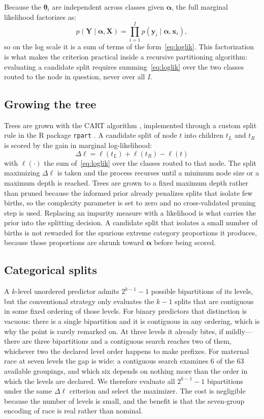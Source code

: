 \documentclass[AMA]{USG}
\begin{document}
Because the \(\boldsymbol{\theta}_i\) are independent across classes given \(\boldsymbol{\alpha}\), the full marginal likelihood factorizes as:
\[
  p(\mathbf{Y}\mid\boldsymbol{\alpha},\mathbf{X})
    = \prod_{i=1}^{I}p(\mathbf{y}_i\mid\boldsymbol{\alpha},\mathbf{x}_i),
\]
so on the log scale it is a sum of terms of the form~\eqref{eq:loglik}. This factorization is what makes the criterion practical inside a recursive partitioning algorithm: evaluating a candidate split requires summing~\eqref{eq:loglik} over the two classes routed to the node in question, never over all \(I\).



\subsection{Growing the tree}
Trees are grown with the CART algorithm \cite{breiman1984}, implemented through a custom split rule in the R package \texttt{rpart} \cite{rpart_docs}. A candidate split of node \(t\) into children \(t_L\) and \(t_R\) is scored by the gain in marginal log-likelihood:
\[\Delta\ell = \ell(t_L) + \ell(t_R) - \ell(t)\]
with \(\ell(\cdot)\) the sum of~\eqref{eq:loglik} over the classes routed to that node. The split maximizing \(\Delta\ell\) is taken and the process recurses until a minimum node size or a maximum depth is reached. Trees are grown to a fixed maximum depth rather than pruned because the informed prior already penalizes splits that isolate few births, so the complexity parameter is set to zero and no cross-validated pruning step is used. Replacing an impurity measure with a likelihood is what carries the prior into the splitting decision. A candidate split that isolates a small number of births is not rewarded for the spurious extreme category proportions it produces, because those proportions are shrunk toward \(\boldsymbol{\alpha}\) before being scored. 


\subsection{Categorical splits}
A \(k\)-level unordered predictor admits \(2^{k-1}-1\) possible bipartitions of its levels, but the conventional strategy only evaluates the \(k-1\) splits that are contiguous in some fixed ordering of those levels. For binary predictors that distinction is vacuous: there is a single bipartition and it is contiguous in any ordering, which is why the point is rarely remarked on. At three levels it already bites, if mildly---there are three bipartitions and a contiguous search reaches two of them, whichever two the declared level order happens to make prefixes. For maternal race at seven levels the gap is wide: a contiguous search examines \(6\) of the \(63\) available groupings, and which six depends on nothing more than the order in which the levels are declared. We therefore evaluate all \(2^{k-1}-1\) bipartitions under the same \(\Delta\ell\) criterion and select the maximizer. The cost is negligible because the number of levels is small, and the benefit is that the seven-group encoding of race is real rather than nominal.
\end{document}
